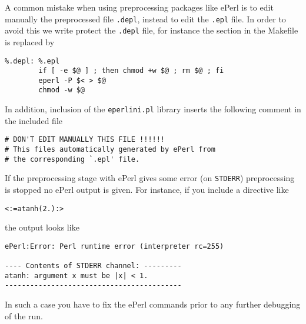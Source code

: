 A common mistake when using preprocessing packages like ePerl is to
edit manually the preprocessed file \verb+.depl+, instead to edit the 
\verb+.epl+ file. In order to avoid this we write protect the
\verb+.depl+ file, for instance the section in the Makefile is
replaced by 
%
\begin{verbatim}
%.depl: %.epl
        if [ -e $@ ] ; then chmod +w $@ ; rm $@ ; fi
        eperl -P $< > $@
        chmod -w $@
\end{verbatim}
%
In addition, inclusion of the \verb+eperlini.pl+ library inserts the
following comment in the included file
%
\begin{verbatim}
# DON'T EDIT MANUALLY THIS FILE !!!!!!
# This files automatically generated by ePerl from 
# the corresponding `.epl' file. 
\end{verbatim}


If the preprocessing stage with ePerl gives some error (on
\verb+STDERR+) preprocessing is stopped no ePerl output is given. For
instance, if you include a directive like 
%
\begin{verbatim}
<:=atanh(2.):>
\end{verbatim}
%
the output looks like
%
\begin{verbatim}
ePerl:Error: Perl runtime error (interpreter rc=255)

---- Contents of STDERR channel: ---------
atanh: argument x must be |x| < 1.
------------------------------------------
\end{verbatim}
%
In such a case you have to fix the ePerl commands prior to any further
debugging of the \pfem{} run. 

